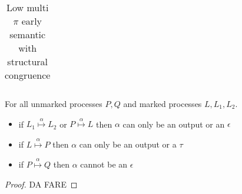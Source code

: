 \begin{definition}
\begin{table}
\begin{tabular}{ll}
      \\\\\hline
    \end{tabular}
    \caption{Low multi $\pi$ early semantic with structural congruence}
    \label{lowleveltransitionrelationearlyoutonly}
  \end{table}
\end{definition}

\begin{lemma}\label{multioutconstraintswithmarked}
  For all unmarked processes $P,Q$ and marked processes $L, L_{1}, L_{2}$.
  \begin{itemize}
    \item
      if $L_{1}\stackrel{\alpha}{\longmapsto}L_{2}$ or  $P\stackrel{\alpha}{\longmapsto}L$ then $\alpha$ can only be an output or an $\epsilon$
    \item
      if $L\stackrel{\alpha}{\longmapsto}P$ then $\alpha$ can only be an output or a $\tau$
    \item
      if $P\stackrel{\alpha}{\longmapsto}Q$ then $\alpha$ cannot be an $\epsilon$
  \end{itemize}
  \begin{proof}
    DA FARE
  \end{proof}
\end{lemma}


